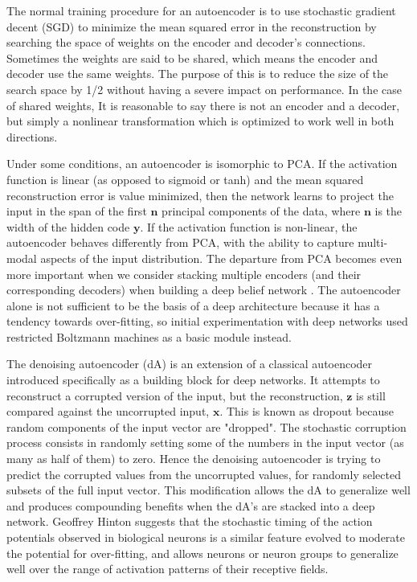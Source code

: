 \documentclass[12pt]{article}
\begin{document}
\begin{doublespacing}
The normal training procedure for an autoencoder is to use stochastic gradient decent (SGD) to minimize the mean squared error in the reconstruction by searching the space of weights on the encoder and decoder's connections. Sometimes the weights are said to be shared, which means the encoder and decoder use the same weights. The purpose of this is to reduce the size of the search space by 1/2 without having a severe impact on performance. In the case of shared weights, It is reasonable to say there is not an encoder and a decoder, but simply a nonlinear transformation which is optimized to work well in both directions. 

Under some conditions, an autoencoder is isomorphic to PCA. If the activation function is linear (as opposed to sigmoid or tanh) and the mean squared reconstruction error is value minimized, then the network learns to project the input in the span of the first $\mathbf n$ principal components of the data, where $\mathbf n$ is the width of the hidden code $\mathbf y$. If the activation function is non-linear, the autoencoder behaves differently from PCA, with the ability to capture multi-modal aspects of the input distribution. The departure from PCA becomes even more important when we consider stacking multiple encoders (and their corresponding decoders) when building a deep belief network \cite{hinton2006reducing}. The autoencoder alone is not sufficient to be the basis of a deep architecture because it has a tendency towards over-fitting, so initial experimentation with deep networks used restricted Boltzmann machines as a basic module instead\cite{salakhutdinov2007restricted}.

The denoising autoencoder (dA) is an extension of a classical autoencoder introduced specifically as a building block for deep networks\cite{vincent2008extracting}.  It attempts to reconstruct a corrupted version of the input, but the reconstruction, $\mathbf z$ is still compared against the uncorrupted input, $\mathbf x$. This is known as dropout because random components of the input vector are "dropped". The stochastic corruption process consists in randomly setting some of the numbers in the input vector (as many as half of them) to zero. Hence the denoising autoencoder is trying to predict the corrupted values from the uncorrupted values, for randomly selected subsets of the full input vector. This modification allows the dA to generalize well and produces compounding benefits when the dA's are stacked into a deep network\cite{hinton2006reducing}. Geoffrey Hinton suggests that the stochastic timing of the action potentials observed in biological neurons is a similar feature evolved to moderate the potential for over-fitting, and allows neurons or neuron groups to generalize well over the range of activation patterns of their receptive fields\cite{hinton2012brains}.
	

\end{doublespacing}
\end{document}
